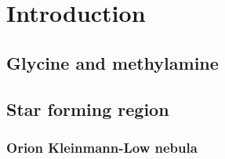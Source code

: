 \chapter{Introduction
  \label{chap:introduction}}



\section{Glycine and methylamine}


\section{Star forming region}
\subsection{Orion Kleinmann-Low nebula}
